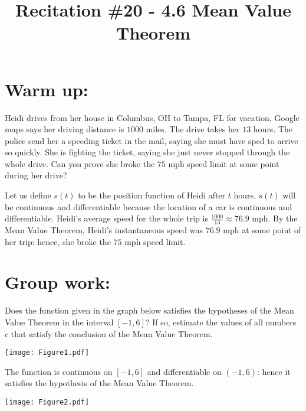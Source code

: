 \documentclass[handout,nooutcomes]{ximera}
\title{Recitation \#20 - 4.6 Mean Value Theorem}
\begin{document}
\begin{abstract}		\end{abstract}
\maketitle

\section*{Warm up:} 
Heidi drives from her house in Columbus, OH to Tampa, FL for vacation.  Google maps says her driving distance is $1000$ miles.  The drive takes her $13$ hours.  The police send her a speeding ticket in the mail, saying she must have sped to arrive so quickly.  She is fighting the ticket, saying she just never stopped through the whole drive.  Can you prove she broke the $75$ mph speed limit at some point during her drive? 
		\begin{freeResponse}
		Let us define $s(t)$ to be the position function of Heidi after $t$ hours.  $s(t)$ will be continuous and differentiable because the location of a car is continuous and differentiable.  Heidi’s average speed for the whole trip is $\frac{1000}{13}\approx 76.9$ mph.  By the Mean Value Theorem, Heidi’s instantaneous speed was $76.9$ mph at some point of her trip: hence, she broke the $75$ mph speed limit.  
		\end{freeResponse}	
		
		
		

	
	
	
	
	

\section*{Group work:}



\begin{problem}
Does the function given in the graph below satisfies the hypotheses of the Mean Value Theorem in the interval $[-1,6]$?  If so, estimate the values of all numbers $c$ that satisfy the conclusion of the Mean Value Theorem.  
	\begin{image}
	\texttt{[image: Figure1.pdf]}
	\end{image}
	
		\begin{freeResponse}
		The function is continuous on $[-1,6]$ and differentiable on $(-1,6)$: hence it satisfies the hypothesis of the Mean Value Theorem.
			\begin{image}
			\texttt{[image: Figure2.pdf]}
			\end{image}
			
		\end{freeResponse}
		
		
		

\end{problem}
\end{document}
